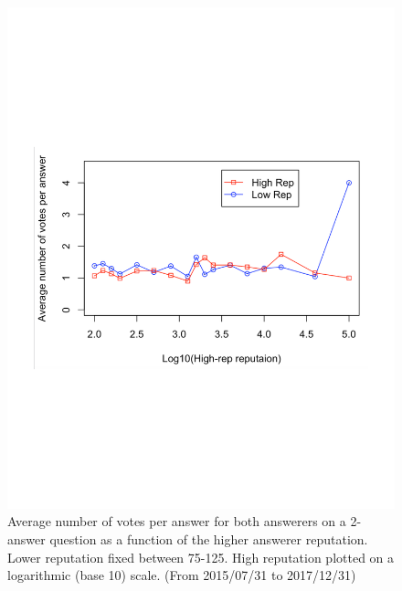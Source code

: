 \begin{figure}[!t]
    \centering
    \includegraphics[width=0.8\columnwidth]{img/Fig6_2017.pdf}
    \caption{Average number of votes per answer for both answerers on a 2-answer question as a function of the higher answerer reputation. Lower reputation fixed between 75-125. High reputation plotted on a logarithmic (base 10) scale. (From 2015/07/31 to 2017/12/31)}
    \label{fig:fig6_2017}
\end{figure}

